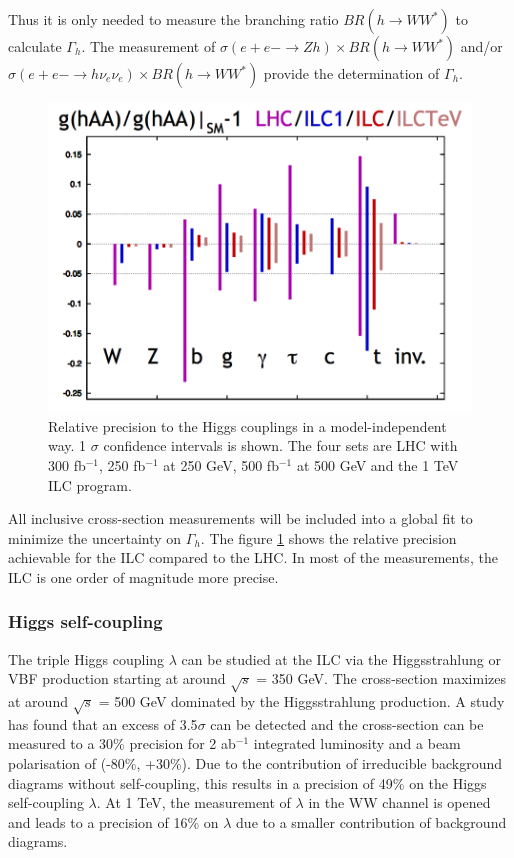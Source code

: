 Thus it is only needed to measure the branching ratio $BR(h \rightarrow WW^*)$ to calculate $\Gamma_{h}$. The measurement of $\sigma(e+e- \rightarrow Zh) \times BR(h \rightarrow WW^*)$ and/or $\sigma(e+e- \rightarrow h\nu_e\nu_e) \times BR(h \rightarrow WW^*)$ provide the determination of $\Gamma_{h}$.
\begin{figure}[htbp!]
  \centering
  \includegraphics[width=0.6\linewidth]{chap2/fig/HiggsCouplings.png}
  \caption{Relative precision to the Higgs couplings in a model-independent way. 1 $\sigma$ confidence intervals is shown. The four sets are LHC with 300 fb$^{-1}$, 250 fb$^{-1}$ at 250 GeV, 500 fb$^{-1}$ at 500 GeV and the 1 TeV ILC program.}  \label{fig:HiggsCouplings}
\end{figure}

All inclusive cross-section measurements will be included into a global fit to minimize the uncertainty on $\Gamma_{h}$. The figure \ref{fig:HiggsCouplings} shows the relative precision achievable for the ILC compared to the LHC. In most of the measurements, the ILC is one order of magnitude more precise.

\subsubsection{Higgs self-coupling}

The triple Higgs coupling $\lambda$ can be studied at the ILC via the Higgsstrahlung or VBF production starting at around $\sqrt{s}$ = 350 GeV. The cross-section maximizes at around $\sqrt{s}$ = 500 GeV dominated by the Higgsstrahlung production. A study \cite{Duerig:2016dvi} has found that an excess of 3.5$\sigma$ can be detected and the cross-section can be measured to a 30\% precision for 2 ab$^{-1}$ integrated luminosity and a beam polarisation of (-80\%, +30\%). Due to the contribution of irreducible background diagrams without self-coupling, this results in a precision of 49\% on the Higgs self-coupling $\lambda$. At 1 TeV, the measurement of $\lambda$ in the WW channel is opened and leads to a precision of 16\% on $\lambda$ due to a smaller contribution of background diagrams.

